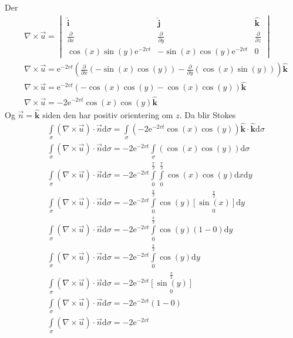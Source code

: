 \documentclass[a4paper,10pt,norsk]{article}
\newcommand{\dd}[1]{\mathrm{d}#1}
\newcommand{\uvec}[1]{\boldsymbol{\hat{\textbf{#1}}}}
\begin{document}
		Der 
		\begin{align*}
			& \nabla \times \vec{u} =
			\begin{vmatrix}
				\uvec{i} &\uvec{j} & \uvec{k}\\
				\frac{\partial }{\partial x} & \frac{\partial }{\partial y} & \frac{\partial }{\partial z} \\
				\cos(x) \sin(y) \mathrm{e}^{-2vt} & - \sin(x) \cos(y) \mathrm{e}^{-2vt} & 0
			\end{vmatrix}\\
			& \nabla \times \vec{u} = \mathrm{e}^{-2vt}\left( \frac{\partial }{\partial x} \left( -\sin(x) \cos(y)  \right) - \frac{\partial }{\partial y} \left( \cos(x) \sin(y)  \right)  \right)  \uvec{k}\\
			& \nabla \times \vec{u} = \mathrm{e}^{-2vt}\left( - \cos(x) \cos(y)  - \cos(x) \cos(y)  \right) \uvec{k}\\
			& \nabla \times \vec{u} = -2\mathrm{e}^{-2vt} \cos(x) \cos(y) \uvec{k}
		\end{align*}
		Og $\vec{n} = \uvec{k}$ siden den har positiv orientering om $z$. Da blir Stokes
		 \begin{align*}
			 &\int\limits_ \sigma \left( \nabla \times \vec{u}  \right) \cdot \vec{n} \dd{\sigma} = \int\limits_ \sigma \left( -2 \mathrm{e}^{-2vt}\cos(x) \cos(y)   \right)\uvec{k} \cdot \uvec{k} \dd{\sigma} \\
			 &\int\limits_ \sigma \left( \nabla \times \vec{u}  \right) \cdot \vec{n} \dd{\sigma} =-2 \mathrm{e}^{-2vt} \int\limits_ \sigma\left( \cos(x) \cos(y)   \right) \dd{\sigma}\\
			 &\int\limits_ \sigma \left( \nabla \times \vec{u}  \right) \cdot \vec{n} \dd{\sigma} = -2 \mathrm{e}^{-2vt} \int\limits_0^{\frac{\pi}{2}} \int\limits_0^{\frac{\pi}{2}}\cos(x) \cos(y) \dd{x}\dd{y}\\
			 &\int\limits_ \sigma \left( \nabla \times \vec{u}  \right) \cdot \vec{n} \dd{\sigma} =-2 \mathrm{e}^{-2vt} \int\limits_0^{\frac{\pi}{2}}\cos(y) \left[\sin(x) \right]\limits_0^{\frac{\pi}{2}} \dd{y}\\
			 &\int\limits_ \sigma \left( \nabla \times \vec{u}  \right) \cdot \vec{n} \dd{\sigma} =-2 \mathrm{e}^{-2vt} \int\limits_0^{\frac{\pi}{2}}\cos(y) \left( 1-0 \right) \dd{y}\\
			 &\int\limits_ \sigma \left( \nabla \times \vec{u}  \right) \cdot \vec{n} \dd{\sigma} =-2 \mathrm{e}^{-2vt} \int\limits_0^{\frac{\pi}{2}}\cos(y) \dd{y}\\
			 &\int\limits_ \sigma \left( \nabla \times \vec{u}  \right) \cdot \vec{n} \dd{\sigma} =-2 \mathrm{e}^{-2vt}\left[\sin(y) \right]\limits_0^{\frac{\pi}{2}}\\
			 &\int\limits_ \sigma \left( \nabla \times \vec{u}  \right) \cdot \vec{n} \dd{\sigma} =-2 \mathrm{e}^{-2vt}\left( 1-0 \right) \\
			 &\int\limits_ \sigma \left( \nabla \times \vec{u}  \right) \cdot \vec{n} \dd{\sigma} =-2 \mathrm{e}^{-2vt}
		\end{align*}
\end{document}

